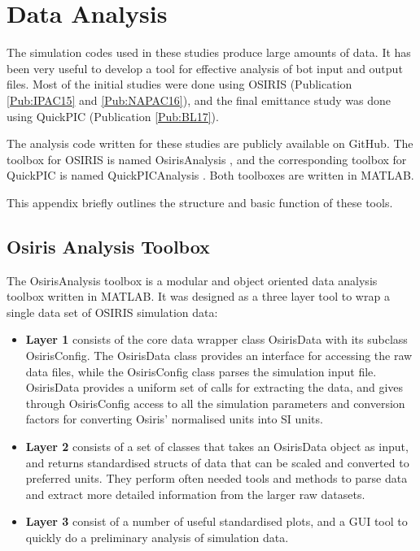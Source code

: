 %
%

\chapter{Data Analysis}
\label{Apx:DA}

The simulation codes used in these studies produce large amounts of data. It has been very useful to develop a tool for effective analysis of bot input and output files. Most of the initial studies were done using OSIRIS (Publication \ref{Pub:IPAC15} and \ref{Pub:NAPAC16}), and the final emittance study was done using QuickPIC (Publication \ref{Pub:BL17}).

The analysis code written for these studies are publicly available on GitHub. The toolbox for OSIRIS is named OsirisAnalysis \cite{code:osiris_analysis:2013}, and the corresponding toolbox for QuickPIC is named QuickPICAnalysis \cite{code:quickpic_analysis:2017}. Both toolboxes are written in MATLAB.

This appendix briefly outlines the structure and basic function of these tools.


\section{Osiris Analysis Toolbox}
\label{Tools:OA}

The OsirisAnalysis toolbox is a modular and object oriented data analysis toolbox written in MATLAB. It was designed as a three layer tool to wrap a single data set of OSIRIS simulation data:

\begin{itemize}
    \item \textbf{Layer 1} consists of the core data wrapper class OsirisData with its subclass OsirisConfig. The OsirisData class provides an interface for accessing the raw data files, while the OsirisConfig class parses the simulation input file. OsirisData provides a uniform set of calls for extracting the data, and gives through OsirisConfig access to all the simulation parameters and conversion factors for converting Osiris' normalised units into SI units.
    \item \textbf{Layer 2} consists of a set of classes that takes an OsirisData object as input, and returns standardised structs of data that can be scaled and converted to preferred units. They perform often needed tools and methods to parse data and extract more detailed information from the larger raw datasets.
    \item \textbf{Layer 3} consist of a number of useful standardised plots, and a GUI tool to quickly do a preliminary analysis of simulation data.
\end{itemize}

